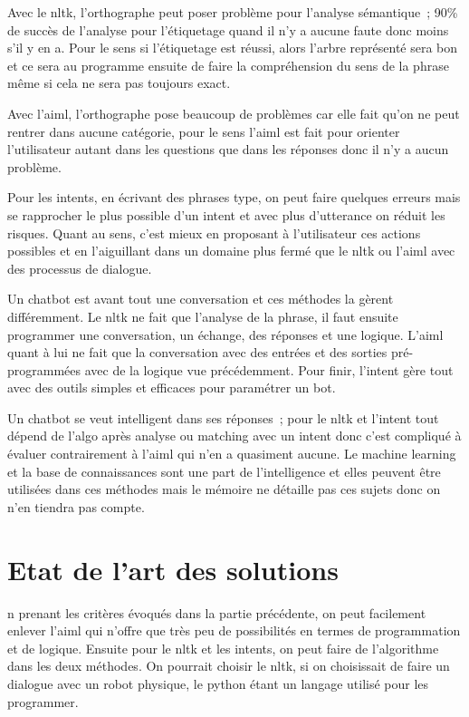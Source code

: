 Avec le nltk, l’orthographe peut poser problème pour l’analyse sémantique ; 90\% de succès de l’analyse pour l’étiquetage quand il n’y a  aucune faute donc moins s’il y en a.
Pour le sens si l’étiquetage est réussi, alors l’arbre représenté sera bon et ce sera au programme ensuite de faire la compréhension du sens de la phrase même si cela ne sera pas toujours exact.
\vspace{1em}

Avec l’aiml, l’orthographe pose beaucoup de problèmes car elle fait qu’on ne peut rentrer dans aucune catégorie, pour le sens l’aiml est fait pour orienter l’utilisateur autant dans les questions que dans les réponses donc il n’y a aucun problème.
\vspace{1em}

Pour les intents, en écrivant des phrases type, on peut faire quelques erreurs mais se rapprocher le plus possible d’un intent et avec plus d’utterance on réduit les risques. Quant au sens, c’est mieux en proposant à l’utilisateur ces actions possibles et en l’aiguillant dans un domaine plus fermé que le nltk ou l’aiml avec des processus de dialogue.
\vspace{1em}

Un chatbot est avant tout une conversation et ces méthodes la gèrent différemment. Le nltk ne fait que l’analyse de la phrase, il faut ensuite programmer une conversation, un échange, des réponses et une logique. L’aiml quant à lui ne fait que la conversation avec des entrées et des sorties pré-programmées  avec de la logique vue précédemment. Pour finir, l’intent gère tout avec des outils simples et efficaces pour paramétrer un bot.
\vspace{1em}

Un chatbot se veut intelligent dans ses réponses ;  pour le nltk et l’intent tout dépend de l’algo après analyse ou matching avec un intent donc c’est compliqué à évaluer contrairement à l’aiml qui n’en a quasiment aucune. Le machine learning et la base de connaissances sont une part de l’intelligence et elles peuvent être utilisées dans ces méthodes mais le mémoire ne détaille pas ces sujets donc on n’en tiendra pas compte.
\vspace{1em}

\section{Etat de l’art des solutions}

n prenant les critères évoqués dans la partie précédente, on peut facilement enlever l’aiml qui n’offre que très peu de possibilités en termes de programmation et de logique.
Ensuite pour le nltk et les intents, on peut faire de l’algorithme dans les deux méthodes. On pourrait choisir le nltk, si on choisissait de faire un dialogue avec un robot physique, le python étant un langage utilisé pour les programmer.
\vspace{1em}

